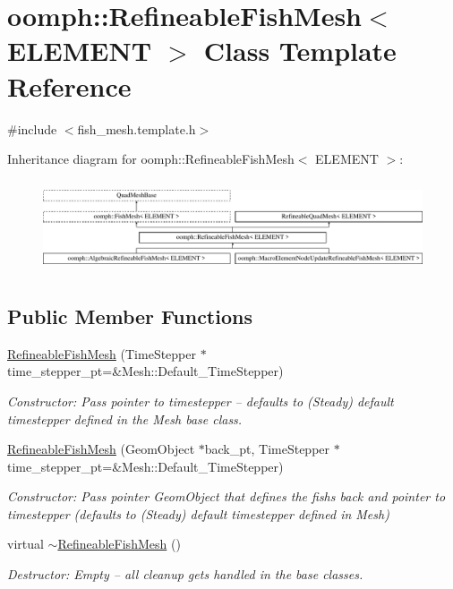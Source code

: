 \hypertarget{classoomph_1_1RefineableFishMesh}{}\section{oomph\+:\+:Refineable\+Fish\+Mesh$<$ E\+L\+E\+M\+E\+NT $>$ Class Template Reference}
\label{classoomph_1_1RefineableFishMesh}


{\ttfamily \#include $<$fish\+\_\+mesh.\+template.\+h$>$}

Inheritance diagram for oomph\+:\+:Refineable\+Fish\+Mesh$<$ E\+L\+E\+M\+E\+NT $>$\+:\begin{figure}[H]
\begin{center}
\leavevmode
\includegraphics[height=2.731707cm]{classoomph_1_1RefineableFishMesh}
\end{center}
\end{figure}
\subsection*{Public Member Functions}
\begin{DoxyCompactItemize}
\item 
\hyperlink{classoomph_1_1RefineableFishMesh_a7f31e65306286e83a5d17459bae9163d}{Refineable\+Fish\+Mesh} (Time\+Stepper $\ast$time\+\_\+stepper\+\_\+pt=\&Mesh\+::\+Default\+\_\+\+Time\+Stepper)
\begin{DoxyCompactList}\small\item\em Constructor\+: Pass pointer to timestepper -- defaults to (Steady) default timestepper defined in the Mesh base class. \end{DoxyCompactList}\item 
\hyperlink{classoomph_1_1RefineableFishMesh_a82bc04aea6deaf2faa7306aa047e12ef}{Refineable\+Fish\+Mesh} (Geom\+Object $\ast$back\+\_\+pt, Time\+Stepper $\ast$time\+\_\+stepper\+\_\+pt=\&Mesh\+::\+Default\+\_\+\+Time\+Stepper)
\begin{DoxyCompactList}\small\item\em Constructor\+: Pass pointer Geom\+Object that defines the fish\textquotesingle{}s back and pointer to timestepper (defaults to (Steady) default timestepper defined in Mesh) \end{DoxyCompactList}\item 
virtual \hyperlink{classoomph_1_1RefineableFishMesh_a8304d093e015001a6d56faebdd2d4636}{$\sim$\+Refineable\+Fish\+Mesh} ()
\begin{DoxyCompactList}\small\item\em Destructor\+: Empty -- all cleanup gets handled in the base classes. \end{DoxyCompactList}\end{DoxyCompactItemize}
